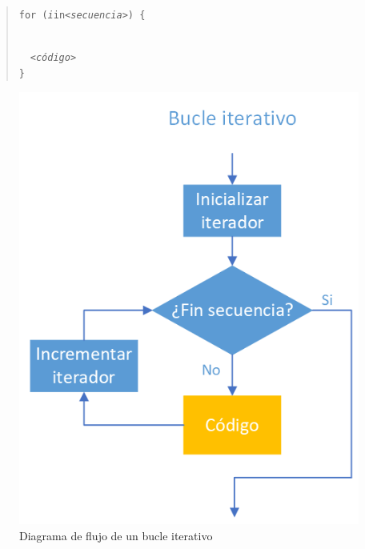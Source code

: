 \documentclass[
  a4paper,
]{scrreport}
\theoremstyle{definition}
\theoremstyle{definition}
\theoremstyle{remark}
\begin{document}
\begin{quote}
\texttt{for\ (}\emph{\texttt{i}}\texttt{in}\emph{\texttt{\textless{}secuencia\textgreater{}}}\texttt{)\ \{}\strut \\
  \emph{\texttt{\textless{}código\textgreater{}}}\\
\texttt{\}}
\end{quote}

\begin{figure}

{\centering \includegraphics{./img/04-estructuras-control/bucle-for.png}

}

\caption{Diagrama de flujo de un bucle iterativo}

\end{figure}
\end{document}
